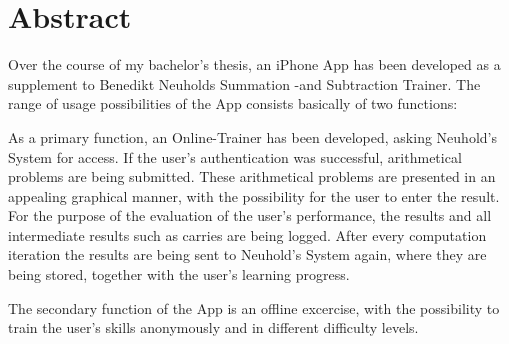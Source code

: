 

\chapter*{Abstract}
\label{cha:abstract_en}

Over the course of my bachelor's thesis, an iPhone App has been developed as a
supplement to Benedikt Neuholds Summation -and Subtraction Trainer.
The range of usage possibilities of the App consists basically of two functions:

As a primary function, an Online-Trainer has been developed, asking Neuhold's 
System for access. If the user's authentication was successful, arithmetical problems
are being submitted.
These arithmetical problems are presented in an appealing graphical manner, with 
the possibility for the user to enter the result.
For the purpose of the evaluation of the user's performance, the results and all
intermediate results such as carries are being logged. After every computation iteration
the results are being sent to Neuhold's System again, where they are being stored, 
together with the user's learning progress.

The secondary function of the App is an offline excercise, with the
possibility to train the user's skills anonymously and in different difficulty 
levels.





